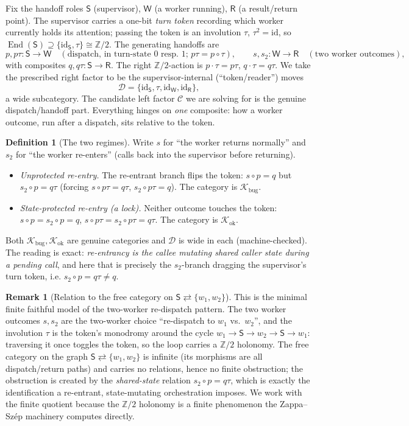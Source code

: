 \documentclass[11pt]{article}
\theoremstyle{definition}
\newtheorem{definition}[theorem]{Definition}
\newtheorem{remark}[theorem]{Remark}
\newcommand{\End}{\operatorname{End}}
\newcommand{\id}{\mathrm{id}}
\newcommand{\C}{\mathcal{C}}
\newcommand{\D}{\mathcal{D}}
\newcommand{\K}{\mathcal{K}}
\newcommand{\Sup}{\mathsf{S}}
\newcommand{\Wk}{\mathsf{W}}
\newcommand{\Rt}{\mathsf{R}}
\begin{document}
Fix the handoff roles $\Sup$ (supervisor), $\Wk$ (a worker running), $\Rt$ (a
result/return point). The supervisor carries a one-bit \emph{turn token} recording
which worker currently holds its attention; passing the token is an involution
$\tau$, $\tau^2=\id$, so $\End(\Sup)\supseteq\{\id_\Sup,\tau\}\cong\mathbb Z/2$.
The generating handoffs are
\[
  p,p\tau:\Sup\to\Wk\quad(\text{dispatch, in turn-state $0$ resp.\ $1$; }p\tau=p\circ\tau),
  \qquad
  s,s_2:\Wk\to\Rt\quad(\text{two worker outcomes}),
\]
with composites $q,q\tau:\Sup\to\Rt$. The right $\mathbb Z/2$-action is
$p\cdot\tau=p\tau$, $q\cdot\tau=q\tau$. We take the prescribed right factor to be
the supervisor-internal (``token/reader'') moves
\[
  \D=\{\id_\Sup,\tau,\id_\Wk,\id_\Rt\},
\]
a wide subcategory. The candidate left factor $\C$ we are solving for is the genuine
dispatch/handoff part. Everything hinges on \emph{one} composite: how a worker
outcome, run after a dispatch, sits relative to the token.

\begin{definition}[The two regimes]\label{def:regimes}
Write $s$ for ``the worker returns normally'' and $s_2$ for ``the worker re-enters''
(calls back into the supervisor before returning).
\begin{itemize}
\item[\textbf{(bug)}] \emph{Unprotected re-entry.} The re-entrant branch flips the
token: $s\circ p=q$ but $s_2\circ p=q\tau$ (forcing $s\circ p\tau=q\tau$,
$s_2\circ p\tau=q$). The category is $\K_{\mathrm{bug}}$.
\item[\textbf{(ok)}] \emph{State-protected re-entry (a lock).} Neither outcome
touches the token: $s\circ p=s_2\circ p=q$, $s\circ p\tau=s_2\circ p\tau=q\tau$.
The category is $\K_{\mathrm{ok}}$.
\end{itemize}
\end{definition}

Both $\K_{\mathrm{bug}},\K_{\mathrm{ok}}$ are genuine categories and $\D$ is wide in
each (machine-checked). The reading is exact: \emph{re-entrancy is the callee
mutating shared caller state during a pending call}, and here that is precisely the
$s_2$-branch dragging the supervisor's turn token, i.e. $s_2\circ p=q\tau\neq q$.

\begin{remark}[Relation to the free category on $\Sup\rightleftarrows\{w_1,w_2\}$]
This is the minimal finite faithful model of the two-worker re-dispatch pattern.
The two worker outcomes $s,s_2$ are the two-worker choice ``re-dispatch to $w_1$
vs.\ $w_2$'', and the involution $\tau$ is the token's monodromy around the cycle
$w_1\to\Sup\to w_2\to\Sup\to w_1$: traversing it once toggles the token, so the loop
carries a $\mathbb Z/2$ holonomy. The free category on the graph
$\Sup\rightleftarrows\{w_1,w_2\}$ is infinite (its morphisms are all dispatch/return
paths) and carries no relations, hence no finite obstruction; the obstruction is
created by the \emph{shared-state} relation $s_2\circ p=q\tau$, which is exactly the
identification a re-entrant, state-mutating orchestration imposes. We work with the
finite quotient because the $\mathbb Z/2$ holonomy is a finite phenomenon the
Zappa--Sz\'ep machinery computes directly.
\end{remark}
\end{document}
